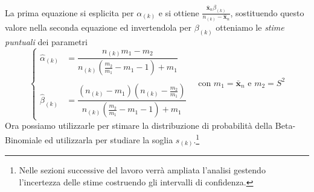\documentclass[10pt]{article} %
\begin{document}
La prima equazione si esplicita per $\alpha_{(k)}$ e si ottiene $\frac{\bar{\mathbf{x}}_{n}\beta_{(k)}}{n_{(k)}-\bar{\mathbf{x}}_{n}}$, sostituendo questo valore nella seconda equazione ed invertendola per $\beta_{(k)}$ otteniamo le \textit{stime puntuali} dei parametri
\begin{equation}\label{stime parametri}
    \begin{cases}
        \hat\alpha_{(k)} &= \dfrac{n_{(k)}m_{1}-m_{2}}{n_{(k)}(\frac{m_{2}}{m_{1}}-{m_{1}} -1)+m_{1}}\\ \\
        \hat\beta_{(k)} &= \dfrac{(n_{(k)}-m_{1})(n_{(k)}-\frac{m_{2}}{m_{1}})}{n_{(k)}(\frac{m_{2}}{m_{1}}-m_{1} -1)+m_{1}}
    \end{cases} \quad \mbox{con } m_{1} = \bar{\mathbf{x}}_{n}\mbox{ e } m_{2} = S^{2}
\end{equation}
Ora possiamo utilizzarle per stimare la distribuzione di probabilità della Beta-Binomiale ed utilizzarla per studiare la soglia $s_{(k)}$.\footnote{Nelle sezioni successive del lavoro verrà ampliata l'analisi gestendo l'incertezza delle stime costruendo gli intervalli di confidenza.}
\end{document}

